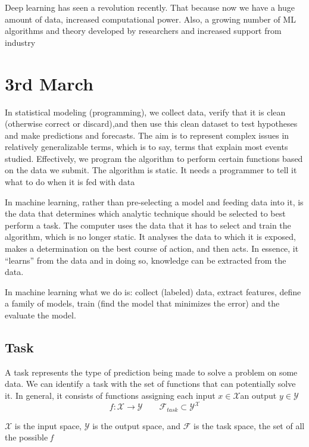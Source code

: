 \documentclass{article}
\begin{document}
	
\bigskip

Deep learning has seen a revolution recently. That because now we have a huge amount of data, increased computational power. Also, a growing number of ML algorithms and theory developed by researchers and increased support from industry
	
\newpage


\section*{3rd March}

In statistical modeling (programming), we collect data, verify that it is clean (otherwise correct or discard),and then use this clean dataset to test hypotheses and make predictions and forecasts. The aim is to represent complex issues in relatively generalizable terms, which is to say, terms that explain most events studied. Effectively, we program the algorithm to perform certain functions based on the data we submit. The algorithm is static. It needs a programmer to tell it what to do when it is fed with data


In machine learning, rather than pre-selecting a model and feeding data into it, is the data that determines which analytic technique should be selected to best perform a task. The computer uses the data that it has to select and train the algorithm, which is no longer static. It analyses the data to which it is exposed, makes a determination on the best course of action, and then acts. In essence, it “learns” from the data and in doing so, knowledge can be extracted from the data.


In machine learning what we do is: collect (labeled) data, extract features, define a family of models, train (find the model that minimizes the error) and the evaluate the model.

\subsection*{Task}
A task represents the type of prediction being made to solve a problem on some data. We can identify a task with the set of functions that can potentially solve it. In general, it consists of functions assigning each input \(x \in \mathcal{X}\)an output \(y \in \mathcal{Y}\)
\[f: \mathcal{X} \rightarrow \mathcal{Y} \qquad \mathcal{F}_{task} \subset  \mathcal{Y}^{\mathcal{X}}\]

\(\mathcal{X} \) is the input space, \(\mathcal{Y} \) is the output space, and \(\mathcal{F} \) is the task space, the set of all the possible \emph{f}
\end{document}
